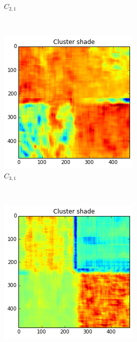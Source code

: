 \documentclass[a4paper]{article}
\begin{document}
\begin{figure}
\begin{subfigure}[b]{0.30\textwidth}
        \caption{%
            $C_{2,1}$
        }
        \label{fig:c21}
    \end{subfigure}
    ~
    \begin{subfigure}[b]{0.30\textwidth}
        \centering
        \includegraphics[width=\textwidth]{cls31.png}
        \caption{%
            $C_{3,1}$
        }
        \label{fig:c31}
    \end{subfigure}
    \\
    \begin{subfigure}[b]{0.30\textwidth}
        \centering
        \includegraphics[width=\textwidth]{cls12.png}

\end{subfigure}
\end{figure}
\end{document}
